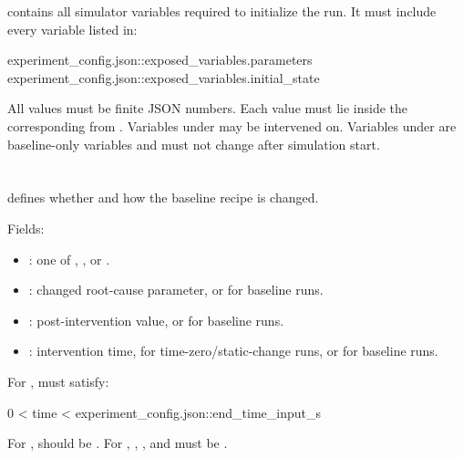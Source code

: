 \documentclass[11pt]{article}
\begin{document}
 contains all simulator variables required to initialize the run.
It must include every variable listed in:

\begin{DocCode}
experiment_config.json::exposed_variables.parameters
experiment_config.json::exposed_variables.initial_state
\end{DocCode}

All values must be finite JSON numbers.
Each value must lie inside the corresponding  from .
Variables under  may be intervened on.
Variables under  are baseline-only variables and must not change after simulation start.

\section*{\texorpdfstring{}{intervention}}

 defines whether and how the baseline recipe is changed.

Fields:

\begin{itemize}
\item {}: one of , , or .
\item {}: changed root-cause parameter, or  for baseline runs.
\item {}: post-intervention value, or  for baseline runs.
\item {}: intervention time,  for time-zero/static-change runs, or  for baseline runs.
\end{itemize}

For ,  must satisfy:

\begin{DocCode}
0 < time < experiment_config.json::end_time_input_s
\end{DocCode}

For ,  should be .
For , , , and  must be .

\section*{\texorpdfstring{}{run\_edges.jsonl}}
\end{document}

